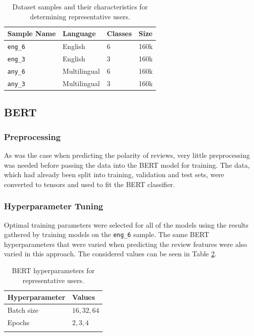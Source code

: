 \begin{table}[ht]
    \centering
    \begin{tabular}{l|l l l}
        \toprule
        \textbf{Sample Name} & \textbf{Language} & \textbf{Classes} & \textbf{Size}\\\midrule
        \texttt{eng\_6} & English & 6 & 160k\\
        \texttt{eng\_3} & English & 3 & 160k\\
        \texttt{any\_6} & Multilingual & 6 & 160k\\
        \texttt{any\_3} & Multilingual & 3 & 160k\\
        \bottomrule
    \end{tabular}
    \caption{Dataset samples and their characteristics for determining representative users.}
    \label{tab:DI_PU_Samples}
\end{table}

\subsection{BERT}

\subsubsection{Preprocessing}

As was the case when predicting the polarity of reviews, very little preprocessing was needed before passing the data into the BERT model for training. The data, which had already been split into training, validation and test sets, were converted to tensors and used to fit the BERT classifier.

\subsubsection{Hyperparameter Tuning}

Optimal training parameters were selected for all of the models using the results gathered by training models on the \texttt{eng\_6} sample. The same BERT hyperparameters that were varied when predicting the review features were also varied in this approach. The considered values can be seen in Table \ref{tab:DI_PU_BERTHP}.

\begin{table}[ht]
    \centering
    \begin{tabular}{l l}
        \toprule
        \textbf{Hyperparameter} & \textbf{Values}\\\midrule
        Batch size & $16, 32, 64$\\
        Epochs & $2, 3, 4$\\
        \bottomrule\\
    \end{tabular}
    \caption{BERT hyperparameters for representative users.}
    \label{tab:DI_PU_BERTHP}
\end{table}

